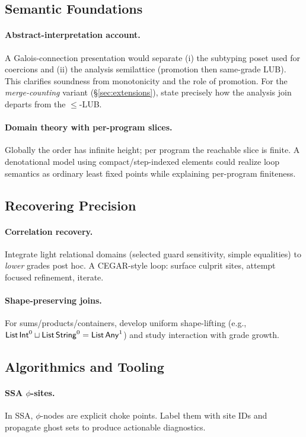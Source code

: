 \subsection{Semantic Foundations}
\paragraph{Abstract-interpretation account.}
A Galois-connection presentation would separate (i) the subtyping poset used for coercions and (ii) the analysis semilattice (promotion then same-grade LUB). This clarifies soundness from monotonicity and the role of promotion. For the \emph{merge-counting} variant (\S\ref{sec:extensions}), state precisely how the analysis join departs from the $\le$-LUB.

\paragraph{Domain theory with per-program slices.}
Globally the order has infinite height; per program the reachable slice is finite. A denotational model using compact/step-indexed elements could realize loop semantics as ordinary least fixed points while explaining per-program finiteness.

\subsection{Recovering Precision}
\paragraph{Correlation recovery.}
Integrate light relational domains (selected guard sensitivity, simple equalities) to \emph{lower} grades post hoc. A CEGAR-style loop: surface culprit sites, attempt focused refinement, iterate.

\paragraph{Shape-preserving joins.}
For sums/products/containers, develop uniform shape-lifting (e.g., $\mathsf{List}\,\mathsf{Int}^0 \sqcup \mathsf{List}\,\mathsf{String}^0 = \mathsf{List}\,\mathsf{Any}^{1}$) and study interaction with grade growth.

\subsection{Algorithmics and Tooling}
\paragraph{SSA $\phi$-sites.}
In SSA, $\phi$-nodes are explicit choke points. Label them with site IDs and propagate ghost sets to produce actionable diagnostics.

